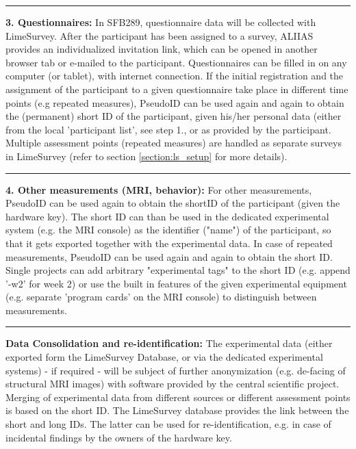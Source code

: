\par\noindent\rule{\textwidth\color{pniblue}}{0.4pt}
\textbf{3. Questionnaires:}
 In SFB289, questionnaire data will be collected with LimeSurvey. After the participant has been assigned to a survey, ALIIAS provides an individualized invitation link, which can be opened in another browser tab or e-mailed to the participant. Questionnaires can be filled in on any computer (or tablet), with internet connection. 
 If the initial registration and the assignment of the participant to a given questionnaire take place in different time points (e.g repeated measures), PseudoID can be used again and again to obtain the (permanent) short ID of the participant, given his/her personal data (either from the local 'participant list', see step 1., or as provided by the participant.
 Multiple assessment points (repeated measures) are handled as separate surveys in LimeSurvey (refer to section \ref{section:ls_setup} for more details).
 
 \par\noindent\rule{\textwidth\color{pniblue}}{0.4pt}
 \textbf{4. Other measurements (MRI, behavior):}
 For other measurements, PseudoID can be used again to obtain the shortID of the participant (given the hardware key). The short ID can than be used in the dedicated experimental system (e.g. the MRI console) as the identifier ("name") of the participant, so that it gets exported together with the experimental data. In case of repeated measurements, PseudoID can be used again and again to obtain the short ID. Single projects can add arbitrary "experimental tags" to the short ID (e.g. append '-w2' for week 2) or use the built in features of the given experimental equipment (e.g. separate 'program cards' on the MRI console) to distinguish between measurements.

\par\noindent\rule{\textwidth\color{pniblue}}{0.4pt}
\textbf{Data Consolidation and re-identification:} The experimental data (either exported form the LimeSurvey Database, or via the dedicated experimental systems) - if required - will be subject of further anonymization (e.g. de-facing of structural MRI images) with software provided by the central scientific project. Merging of experimental data from different sources or different assessment points is based on the short ID. The LimeSurvey database provides the link between the short and long IDs. The latter can be used for re-identification, e.g. in case of incidental findings by the owners of the hardware key.